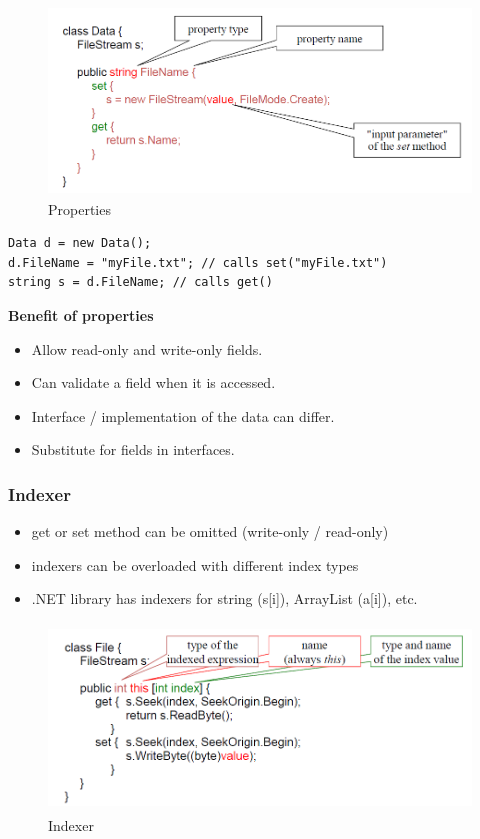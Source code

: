 \begin{figure}[h]
	\centering
	\includegraphics[height=5cm, ]{images/CSharp/Properties}
	\caption{Properties}
\end{figure}

\begin{lstlisting}
Data d = new Data();
d.FileName = "myFile.txt"; // calls set("myFile.txt")
string s = d.FileName; // calls get()
\end{lstlisting}

\textbf{Benefit of properties}
\begin{multicols}{2}
\begin{itemize}
	\item Allow read-only and write-only fields.
	\item Can validate a field when it is accessed.
\end{itemize}
\columnbreak
\begin{itemize}
	\item Interface / implementation of the data can differ.
	\item Substitute for fields in interfaces.
\end{itemize}
\end{multicols}

\subsubsection{Indexer}
\begin{itemize}
	\item get or set method can be omitted (write-only / read-only)
	\item indexers can be overloaded with different index types
	\item .NET library has indexers for string (s[i]), ArrayList (a[i]), etc.
\end{itemize}

\begin{figure}[h]
	\centering
	\includegraphics[height=5cm, ]{images/CSharp/Indexer}
	\caption{Indexer}
\end{figure}

